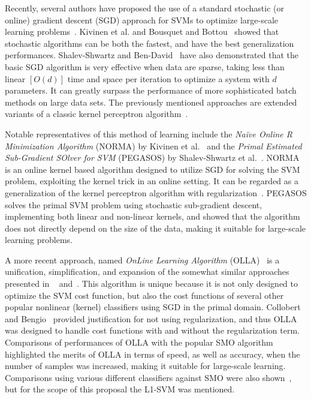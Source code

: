 \documentclass[reqno]{vcuthesis}
\numberwithin{equation}{chapter}
\begin{document}
Recently, several authors have proposed the use of a standard stochastic (or online) gradient descent (SGD) approach for SVMs to optimize large-scale learning problems~\cite{herbrich2016learning,kivinen2002large,Schoelkopf2002,Shalev2014,shalev2011pegasos}. Kivinen et al.\cite{kivinen2004online} and Bousquet and Bottou~\cite{bousquet2008tradeoffs} showed that stochastic algorithms can be both the fastest, and have the best generalization performances. Shalev-Shwartz and Ben-David~\cite{Shalev2014} have also demonstrated that the basic SGD algorithm is very effective when data are sparse, taking less than linear $[O(d)]$ time and space per iteration to optimize a system with $d$ parameters. It can greatly surpass the performance of more sophisticated batch methods on large data sets. The previously mentioned approaches are extended variants of a classic kernel perceptron algorithm~\cite{collobert2004links}. 

Notable representatives of this method of learning include the \textit{Na{\"i}ve Online R Minimization Algorithm} (NORMA) by Kivinen et al.~\cite{kivinen2004online} and the \textit{Primal Estimated Sub-Gradient SOlver for SVM} (PEGASOS) by Shalev-Shwartz et al.~\cite{shalev2011pegasos}. NORMA is an online kernel based algorithm designed to utilize SGD for solving the SVM problem, exploiting the kernel trick in an online setting. It can be regarded as a generalization of the kernel perceptron algorithm with regularization~\cite{kivinen2004online}. PEGASOS solves the primal SVM problem using stochastic sub-gradient descent, implementing both linear and non-linear kernels, and showed that the algorithm does not directly depend on the size of the data, making it suitable for large-scale learning problems. 

A more recent approach, named \textit{OnLine Learning Algorithm} (OLLA)~\cite{kecman2016fast} is a unification, simplification, and expansion of the somewhat similar approaches presented in
~\cite{herbrich2016learning,kivinen2002large,Schoelkopf2002,Shalev2014,shalev2011pegasos} and~\cite{kecman2016ieee,Melki2016,melki2016fast}. This algorithm is unique because it is not only designed to optimize the SVM cost function, but also the cost functions of several other popular nonlinear (kernel) classifiers using SGD in the primal domain. Collobert and Bengio~\cite{collobert2004links} provided justification for not using regularization, and thus OLLA was designed to handle cost functions with and without the regularization term. Comparisons of performances of OLLA with the popular SMO algorithm highlighted the merits of OLLA in terms of speed, as well as accuracy, when the number of samples was increased, making it suitable for large-scale learning. Comparisons using various different classifiers against SMO were also shown~\cite{kecman2016fast}, but for the scope of this proposal the L1-SVM was mentioned.
\end{document}
